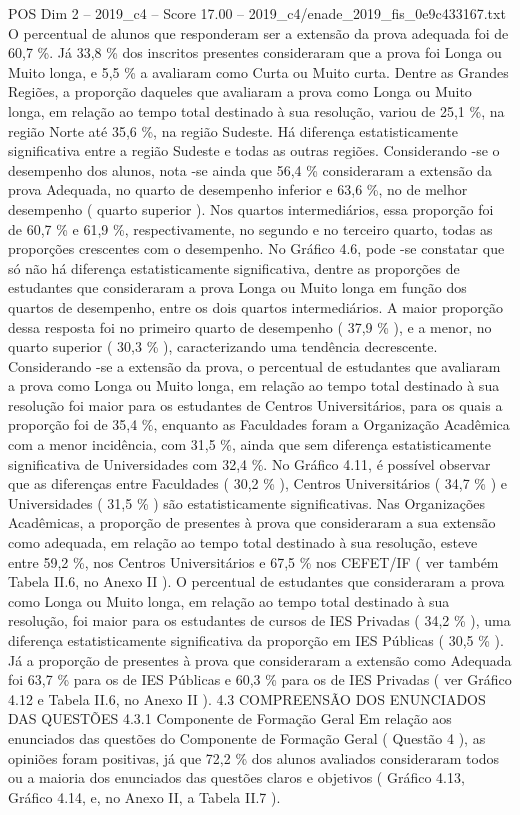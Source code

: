 \begin{textsample}{POS Dim 2 – 2019\_c4 – Score 17.00 – 2019\_c4/enade\_2019\_fis\_0e9c433167.txt}
O percentual de alunos que responderam ser a extensão da prova adequada foi de 60,7 \%.
Já 33,8 \% dos inscritos presentes consideraram que a prova foi Longa ou Muito longa, e 5,5 \% a avaliaram como Curta ou Muito curta.
Dentre as Grandes Regiões, a proporção daqueles que avaliaram a prova como Longa ou Muito longa, em relação ao tempo total destinado à sua resolução, variou de 25,1 \%, na região Norte até 35,6 \%, na região Sudeste.
Há diferença estatisticamente significativa entre a região Sudeste e todas as outras regiões.
Considerando -se o desempenho dos alunos, nota -se ainda que 56,4 \% consideraram a extensão da prova Adequada, no quarto de desempenho inferior e 63,6 \%, no de melhor desempenho ( quarto superior ).
Nos quartos intermediários, essa proporção foi de 60,7 \% e 61,9 \%, respectivamente, no segundo e no terceiro quarto, todas as proporções crescentes com o desempenho.
No Gráfico 4.6, pode -se constatar que só não há diferença estatisticamente significativa, dentre as proporções de estudantes que consideraram a prova Longa ou Muito longa em função dos quartos de desempenho, entre os dois quartos intermediários.
A maior proporção dessa resposta foi no primeiro quarto de desempenho ( 37,9 \% ), e a menor, no quarto superior ( 30,3 \% ), caracterizando uma tendência decrescente.
Considerando -se a extensão da prova, o percentual de estudantes que avaliaram a prova como Longa ou Muito longa, em relação ao tempo total destinado à sua resolução foi maior para os estudantes de Centros Universitários, para os quais a proporção foi de 35,4 \%, enquanto as Faculdades foram a Organização Acadêmica com a menor incidência, com 31,5 \%, ainda que sem diferença estatisticamente significativa de Universidades com 32,4 \%.
No Gráfico 4.11, é possível observar que as diferenças entre Faculdades ( 30,2 \% ), Centros Universitários ( 34,7 \% ) e Universidades ( 31,5 \% ) são estatisticamente significativas.
Nas Organizações Acadêmicas, a proporção de presentes à prova que consideraram a sua extensão como adequada, em relação ao tempo total destinado à sua resolução, esteve entre 59,2 \%, nos Centros Universitários e 67,5 \% nos CEFET/IF ( ver também Tabela II.6, no Anexo II ).
O percentual de estudantes que consideraram a prova como Longa ou Muito longa, em relação ao tempo total destinado à sua resolução, foi maior para os estudantes de cursos de IES Privadas ( 34,2 \% ), uma diferença estatisticamente significativa da proporção em IES Públicas ( 30,5 \% ).
Já a proporção de presentes à prova que consideraram a extensão como Adequada foi 63,7 \% para os de IES Públicas e 60,3 \% para os de IES Privadas ( ver Gráfico 4.12 e Tabela II.6, no Anexo II ). 4.3 COMPREENSÃO DOS ENUNCIADOS DAS QUESTÕES 4.3.1 Componente de Formação Geral Em relação aos enunciados das questões do Componente de Formação Geral ( Questão 4 ), as opiniões foram positivas, já que 72,2 \% dos alunos avaliados consideraram todos ou a maioria dos enunciados das questões claros e objetivos ( Gráfico 4.13, Gráfico 4.14, e, no Anexo II, a Tabela II.7 ).

\end{textsample}
